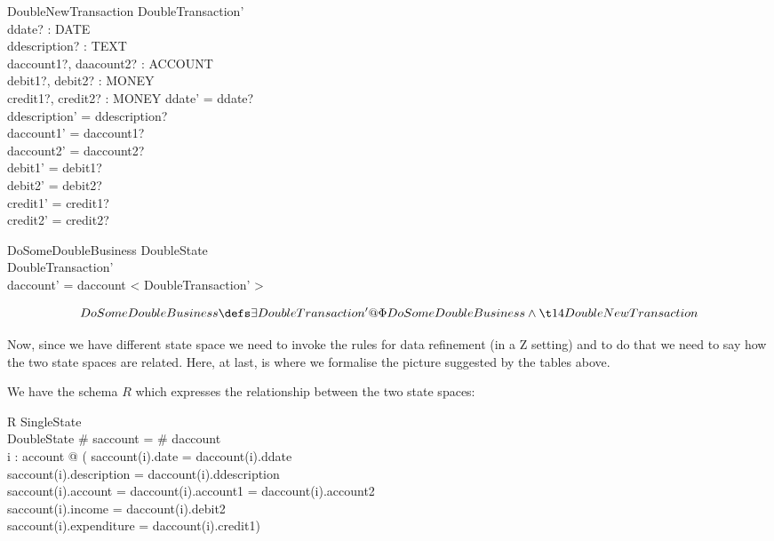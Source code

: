 \documentclass[11pt]{amsart}
\begin{document}
\begin{schema}{DoubleNewTransaction}
DoubleTransaction'\\
ddate? : DATE\\
ddescription? : TEXT\\
daccount1?, daacount2? : ACCOUNT\\ 
debit1?, debit2? : MONEY\\
credit1?, credit2? : MONEY
\where
ddate' = ddate?\\
ddescription' = ddescription?\\
daccount1' = daccount1?\\
daccount2' = daccount2?\\
debit1' = debit1?\\
debit2' = debit2?\\
credit1' = credit1?\\
credit2' = credit2?
\end{schema}

\begin{schema}{\Phi DoSomeDoubleBusiness}
\Delta DoubleState\\
DoubleTransaction'\\
\where
daccount' = daccount \cat < \theta DoubleTransaction' >
\end{schema}

\[
DoSomeDoubleBusiness \defs \exists DoubleTransaction' @ \Phi DoSomeDoubleBusiness \land\\
\t14 DoubleNewTransaction
\]

Now, since we have different state space we need to invoke the rules for data refinement (in a Z setting) and to do that we need to say how the two state spaces are related. Here, at last, is where we formalise the picture suggested by the tables above.

We have the schema $R$ which expresses the relationship between the two state spaces:

\begin{schema}{R}
SingleState\\
DoubleState
\where
\# saccount = \# daccount\\
\forall i : \dom account @ (
saccount(i).date = daccount(i).ddate \land\\
saccount(i).description = daccount(i).ddescription \land\\
saccount(i).account = daccount(i).account1 = daccount(i).account2 \land\\
saccount(i).income = daccount(i).debit2 \land\\
saccount(i).expenditure = daccount(i).credit1)
\end{schema}
\end{document}
